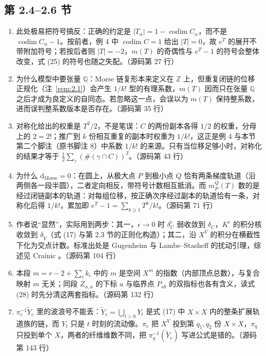\subsection*{第 2.4–2.6 节}
\begin{enumerate}
  \item 此处极易把符号搞反：正确的约定是 $|T_\alpha|=1-\operatorname{codim}C_\alpha$，而不是 $\operatorname{codim}C_\alpha-1$。按前者，例 4 中 $\operatorname{codim}C=1$ 给出 $|T|=0$，故 $e^T$ 的展开不带附加符号；若按后者则 $|T|=-2$，$m(T)$ 的奇偶性与 $e^T-1$ 的符号会整体改变，式 (25) 的符号也随之失配。\hfill{\footnotesize （源码第 27 行）}
  \item 为什么模型中要张量 $\mathbb Q$：Morse 链复形本来定义在 $\mathbb Z$ 上，但重复闭链的位移正规化（注~\ref{rem:2.1}）会产生 $1/k!$ 型的有理系数，$m(T)$ 因而只在张量 $\mathbb Q$ 之后才成为良定义的自同态。若忽略这一点，会误以为 $m(T)$ 保持整系数，进而误判整系数版本是否存在。\hfill{\footnotesize （源码第 35 行）}
  \item 对称化给出的权重是 $T^2/2$，不是笔误：$C$ 的两份副本各得 $1/2$ 的权重，分母上的 $2=2!$；推广到 $k$ 份相互重复的副本时权重为 $1/k!$，这正是例 4 与本节第二个脚注（原书脚注 8）中系数 $1/k!$ 的来源。只有当位移足够小时，对称化的结果才等于 $\tfrac12\sum_\gamma(\#(\gamma\cap C))^2$。\hfill{\footnotesize （源码第 43 行）}
  \item 为什么 $\mathrm{d}_{\mathrm{Morse}}=0$：在圆上，从极大点 $P$ 到极小点 $Q$ 恰有两条梯度轨道（沿两侧各一段半圆），二者定向相反，带符号计数相互抵消。而 $m_P^Q(T)$ 数的是经过闭链副本的轨道：对每组位移，按正确次序经过副本的轨道恰有一条，对称化后得 $1/k!$，累加即 $e^T-1=\sum_{k\ge 1}T^k/k!$。\hfill{\footnotesize （源码第 71 行）}
  \item 作者说“显然”，实际用到两步：其一，$\epsilon\to0$ 时 $\delta^\epsilon_C$ 弱收敛到 $\delta_C$，$K^\epsilon$ 的积分核收敛到 $\delta_{\widetilde Y}$（式 (17) 与第 2.3 节的正则化构造）；其二，沿 $X^V$ 的积分在横截性下化为交点计数。标准出处是 Gugenheim \cite{gugenheim} 与 Lambe--Stasheff \cite{lambe} 的扰动引理，综述见 Crainic \cite{crainic}。\hfill{\footnotesize （源码第 104 行）}
  \item 本段 $m=r-2+\sum_i k_i$ 中的 $m$ 是空间 $X^m$ 的指数（内部顶点总数），与复合映射 $m$ 无关；同段 $Z_{\alpha,a}$ 的下标 $a$ 与临界点 $P_{ab}$ 的双指标也各有含义，读式 (28) 时先分清这两套指标。\hfill{\footnotesize （源码第 132 行）}
  \item $\pi_e^{-1}\widetilde Y_e$ 里的波浪号不能丢：$\widetilde Y_e=\bigcup_{t>0}Y_t$ 是式 (17) 中 $X\times X$ 内的整条扩展轨道族的链，而 $Y_t$ 只是 $t$ 时刻的流动像。$\pi_e$ 把 $X^V$ 投到第 $q_1,q_2$ 份 $X\times X$，$\pi_q$ 只投到单个 $X$，两者的纤维维数不同，把 $\pi_q^{-1}(\widetilde Y_e)$ 写进公式是错的。\hfill{\footnotesize （源码第 143 行）}

\end{enumerate}
